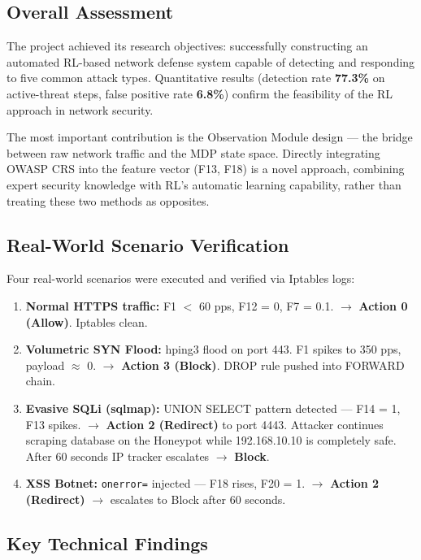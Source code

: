 \documentclass[12pt,a4paper]{report}
\begin{document}
\subsection{Overall Assessment}

The project achieved its research objectives: successfully constructing an automated RL-based network defense system capable of detecting and responding to five common attack types. Quantitative results (detection rate \textbf{77.3\%} on active-threat steps, false positive rate \textbf{6.8\%}) confirm the feasibility of the RL approach in network security.

The most important contribution is the Observation Module design --- the bridge between raw network traffic and the MDP state space. Directly integrating OWASP CRS into the feature vector (F13, F18) is a novel approach, combining expert security knowledge with RL's automatic learning capability, rather than treating these two methods as opposites.

\subsection{Real-World Scenario Verification}

Four real-world scenarios were executed and verified via Iptables logs:

\begin{enumerate}
  \item \textbf{Normal HTTPS traffic:} F1 $<$ 60 pps, F12 = 0, F7 = 0.1. $\to$ \textbf{Action 0 (Allow)}. Iptables clean.
  \item \textbf{Volumetric SYN Flood:} hping3 flood on port 443. F1 spikes to 350 pps, payload $\approx$ 0. $\to$ \textbf{Action 3 (Block)}. DROP rule pushed into FORWARD chain.
  \item \textbf{Evasive SQLi (sqlmap):} UNION SELECT pattern detected --- F14 = 1, F13 spikes. $\to$ \textbf{Action 2 (Redirect)} to port 4443. Attacker continues scraping database on the Honeypot while 192.168.10.10 is completely safe. After 60 seconds IP tracker escalates $\to$ \textbf{Block}.
  \item \textbf{XSS Botnet:} \texttt{onerror=} injected --- F18 rises, F20 = 1. $\to$ \textbf{Action 2 (Redirect)} $\to$ escalates to Block after 60 seconds.
\end{enumerate}

\subsection{Key Technical Findings}
\end{document}
